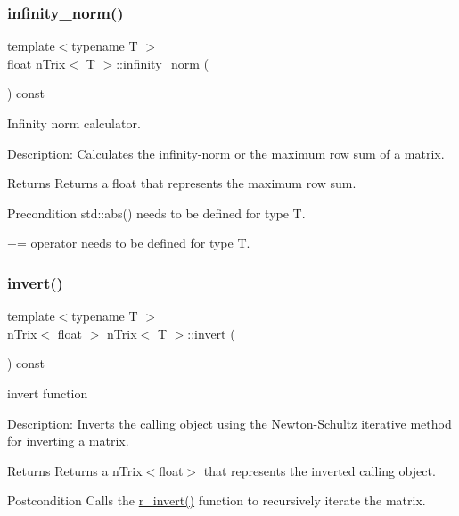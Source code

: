 \subsubsection{\texorpdfstring{infinity\+\_\+norm()}{infinity\_norm()}}
{\footnotesize\ttfamily template$<$typename T $>$ \\
float \hyperlink{classnTrix}{n\+Trix}$<$ T $>$\+::infinity\+\_\+norm (\begin{DoxyParamCaption}{ }\end{DoxyParamCaption}) const}



Infinity norm calculator. 

Description\+: Calculates the infinity-\/norm or the maximum row sum of a matrix. \begin{DoxyReturn}{Returns}
Returns a float that represents the maximum row sum. 
\end{DoxyReturn}
\begin{DoxyPrecond}{Precondition}
std\+::abs() needs to be defined for type T. 

+= operator needs to be defined for type T. 
\end{DoxyPrecond}
\mbox{\label{classnTrix_af96c6e8b9eceb4e8a173969db7fdf938}} 
\subsubsection{\texorpdfstring{invert()}{invert()}}
{\footnotesize\ttfamily template$<$typename T $>$ \\
\hyperlink{classnTrix}{n\+Trix}$<$ float $>$ \hyperlink{classnTrix}{n\+Trix}$<$ T $>$\+::invert (\begin{DoxyParamCaption}{ }\end{DoxyParamCaption}) const}



invert function 

Description\+: Inverts the calling object using the Newton-\/\+Schultz iterative method for inverting a matrix. \begin{DoxyReturn}{Returns}
Returns a n\+Trix$<$float$>$ that represents the inverted calling object. 
\end{DoxyReturn}
\begin{DoxyPostcond}{Postcondition}
Calls the \hyperlink{nTrix_8h_acb6ffe9fd3e8aa373a570884247ac35b}{r\+\_\+invert()} function to recursively iterate the matrix. 
\end{DoxyPostcond}

